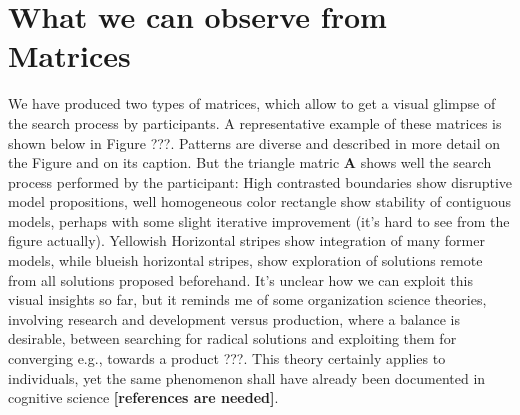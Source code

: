 \section{What we can observe from Matrices} We have produced two types of matrices, which allow to get a visual glimpse of the search process by participants. A representative example of these matrices is shown below in Figure ???. Patterns are diverse and described in more detail on the Figure and on its caption. But the triangle matric {\bf A} shows well the search process performed by the participant: High contrasted boundaries show disruptive model propositions, well homogeneous color rectangle show stability of contiguous models, perhaps with some slight iterative improvement (it's hard to see from the figure actually). Yellowish Horizontal stripes show integration of many former models, while blueish horizontal stripes, show exploration of solutions remote from all solutions proposed beforehand.  It's unclear how we can exploit this visual insights so far, but it reminds me of some organization science theories, involving research and development versus production, where a balance is desirable, between searching for radical solutions and exploiting them for converging e.g., towards a product ???. This theory certainly applies to individuals, yet the same phenomenon shall have already been documented in cognitive science {\bf [references are needed]}. 
  
  
  
  
  
  
  
  